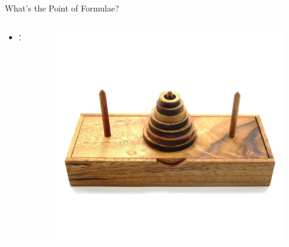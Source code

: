\documentclass[10pt]{beamer}
\begin{document}
\begin{frame}{What's the Point of Formulae?}
	
	\begin{columns}	
		\begin{column}{0.5\textwidth}
			\begin{itemize}[<+->]
				\item $2^n - 1$				
			\end{itemize}
		\end{column}
		\begin{column}{0.5\textwidth}
			\begin{figure}[h]		
				\centering
				\includegraphics[scale=0.1]{hanoi.jpg}
				\caption*{}
			\end{figure}
		\end{column}
	\end{columns}

	
\end{frame}
\end{document}
